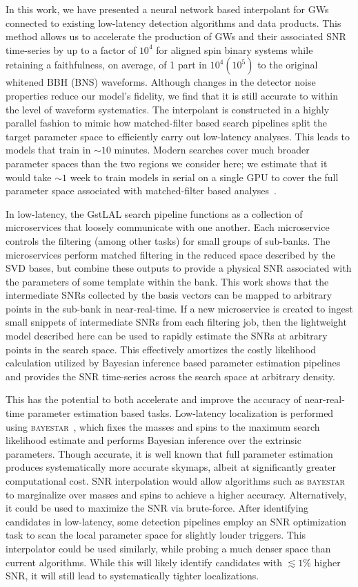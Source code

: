 \documentclass[twocolumn,prd,superscriptaddress,nofootinbib]{revtex4-1}
\begin{document}
In this work, we have presented a neural network based interpolant for GWs
connected to existing low-latency detection algorithms and data products. This
method allows us to accelerate the production of GWs and their associated SNR
time-series by up to a factor of $10^4$ for aligned spin binary systems while
retaining a faithfulness, on average, of 1 part in $10^4 (10^5)$ to the
original whitened BBH (BNS) waveforms. Although changes in the detector noise
properties reduce our model's fidelity, we find that it is still accurate to
within the level of waveform systematics.  The interpolant is constructed in a
highly parallel fashion to mimic how matched-filter based search pipelines
split the target parameter space to efficiently carry out low-latency analyses.
This leads to models that train in $\sim 10$ minutes. Modern searches cover
much broader parameter spaces than the two regions we consider here; we
estimate that it would take $\sim 1$ week to
train models in serial on a single GPU to cover the full parameter space
associated with matched-filter based analyses~\cite{Sakon:2022ibh}.

In low-latency, the GstLAL search pipeline functions as a collection of
microservices that loosely communicate with one another. Each microservice
controls the filtering (among other tasks) for small groups of sub-banks. The
microservices perform matched filtering in the reduced space described by the
SVD bases, but combine these outputs to provide a physical SNR associated with
the parameters of some template within the bank.  This work shows that the
intermediate SNRs collected by the basis vectors can be mapped to arbitrary
points in the sub-bank in near-real-time. If a new microservice is created to
ingest small snippets of intermediate SNRs from each filtering job, then the
lightweight model described here can be used to rapidly estimate the SNRs
at arbitrary points in the search space. This effectively amortizes the costly
likelihood calculation utilized by Bayesian inference based parameter
estimation pipelines and provides the SNR time-series across the search space
at arbitrary density.

This has the potential to both accelerate and improve
the accuracy of near-real-time parameter estimation based tasks. Low-latency
localization is performed using \textsc{bayestar}~\cite{Singer:2015ema}, which
fixes the masses and spins to the maximum search likelihood
estimate and performs Bayesian inference over the extrinsic parameters.
Though
accurate, it is well known that full parameter estimation produces
systematically more accurate skymaps, albeit at significantly greater
computational cost. SNR interpolation would allow algorithms such as
\textsc{bayestar} to marginalize over masses and spins to achieve a higher
accuracy. Alternatively, it could be used to maximize the SNR via
brute-force. After identifying candidates in low-latency, some detection
pipelines employ an SNR optimization task to scan the local parameter space for
slightly louder triggers. This interpolator could be used similarly, while
probing a much denser space than current algorithms. While this will likely
identify candidates with $\lesssim 1\%$ higher SNR, it will still lead to
systematically tighter localizations.
\end{document}
